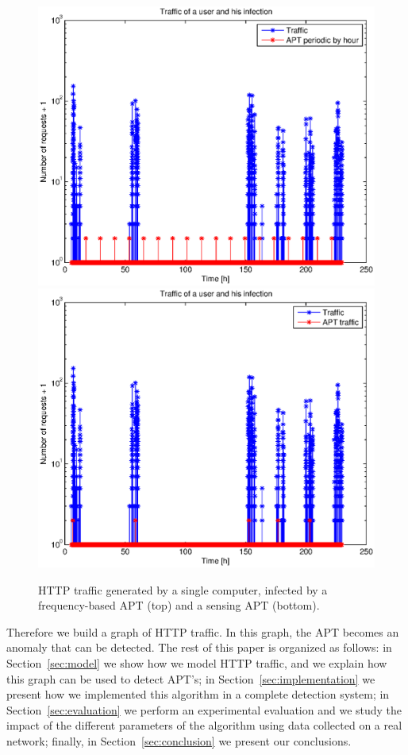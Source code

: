 \documentclass[conference]{IEEEtran}
\begin{document}
\begin{figure}
  \centering
  \includegraphics[width=0.9\linewidth]{traffic_perio.eps}
  \includegraphics[width=0.9\linewidth]{traffic_traffic.eps}
  \caption{HTTP traffic generated by a single computer, infected by a frequency-based APT (top) and a sensing APT (bottom).}
  \label{fig:traffic}
\end{figure}

Therefore we build a graph of HTTP traffic. In this graph, the APT becomes an anomaly that can be detected. The rest of this paper is organized as follows: in Section~\ref{sec:model} we show how we model HTTP traffic, and we explain how this graph can be used to detect APT's; in Section~\ref{sec:implementation} we present how we implemented this algorithm in a complete detection system; in Section~\ref{sec:evaluation} we perform an experimental evaluation and we study the impact of the different parameters of the algorithm using data collected on a real network; finally, in Section~\ref{sec:conclusion} we present our conclusions.
\end{document}
